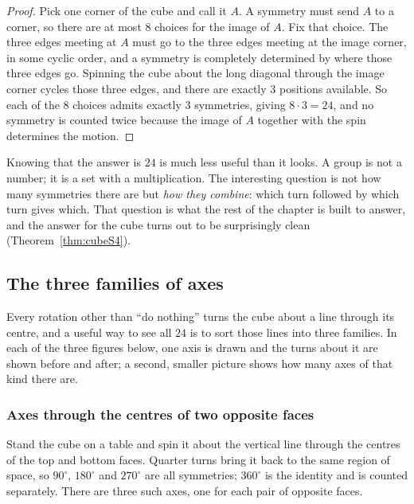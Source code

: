 \begin{proof}
Pick one corner of the cube and call it $A$. A symmetry must send $A$ to a corner, so there are at
most $8$ choices for the image of $A$. Fix that choice. The three edges meeting at $A$ must go to
the three edges meeting at the image corner, in some cyclic order, and a symmetry is completely
determined by where those three edges go. Spinning the cube about the long diagonal through the
image corner cycles those three edges, and there are exactly $3$ positions available. So each of
the $8$ choices admits exactly $3$ symmetries, giving $8\cdot 3=24$, and no symmetry is counted
twice because the image of $A$ together with the spin determines the motion.
\end{proof}

\begin{bigpic}
Knowing that the answer is $24$ is much less useful than it looks. A group is not a number; it is a
set with a multiplication. The interesting question is not how many symmetries there are but
\emph{how they combine}: which turn followed by which turn gives which. That question is what the
rest of the chapter is built to answer, and the answer for the cube turns out to be surprisingly
clean (Theorem~\ref{thm:cubeS4}).
\end{bigpic}

\subsection{The three families of axes}

Every rotation other than ``do nothing'' turns the cube about a line through its centre, and a
useful way to see all $24$ is to sort those lines into three families. In each of the three figures
below, one axis is drawn and the turns about it are shown before and after; a second, smaller
picture shows how many axes of that kind there are.

\subsubsection{Axes through the centres of two opposite faces}

Stand the cube on a table and spin it about the vertical line through the centres of the top and
bottom faces. Quarter turns bring it back to the same region of space, so $90^\circ$, $180^\circ$
and $270^\circ$ are all symmetries; $360^\circ$ is the identity and is counted separately. There
are three such axes, one for each pair of opposite faces.

